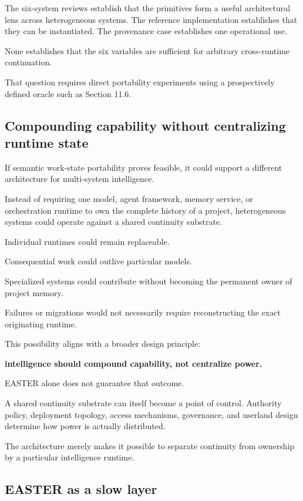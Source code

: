 \documentclass[11pt]{article}
\begin{document}
The six-system reviews establish that the primitives form a useful architectural lens across heterogeneous systems. The reference implementation establishes that they can be instantiated. The provenance case establishes one operational use.

None establishes that the six variables are sufficient for arbitrary cross-runtime continuation.

That question requires direct portability experiments using a prospectively defined oracle such as Section 11.6.

\subsection{Compounding capability without centralizing runtime state}

If semantic work-state portability proves feasible, it could support a different architecture for multi-system intelligence.

Instead of requiring one model, agent framework, memory service, or orchestration runtime to own the complete history of a project, heterogeneous systems could operate against a shared continuity substrate.

Individual runtimes could remain replaceable.

Consequential work could outlive particular models.

Specialized systems could contribute without becoming the permanent owner of project memory.

Failures or migrations would not necessarily require reconstructing the exact originating runtime.

This possibility aligns with a broader design principle:

\textbf{intelligence should compound capability, not centralize power.}

EASTER alone does not guarantee that outcome.

A shared continuity substrate can itself become a point of control. Authority policy, deployment topology, access mechanisms, governance, and userland design determine how power is actually distributed.

The architecture merely makes it possible to separate continuity from ownership by a particular intelligence runtime.

\subsection{EASTER as a slow layer}
\end{document}

